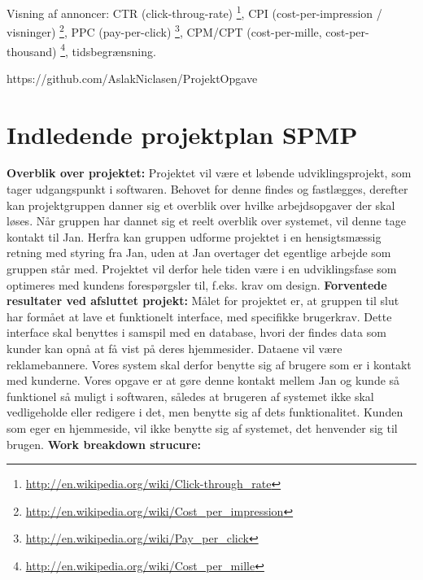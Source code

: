 \documentclass[a4paper,12pt]{article}
\begin{document}
Visning af annoncer: 
CTR (click-throug-rate) \footnote{\url{http://en.wikipedia.org/wiki/Click-through\_rate}}, CPI (cost-per-impression / visninger) \footnote{\url{http://en.wikipedia.org/wiki/Cost\_per\_impression}}, PPC (pay-per-click) \footnote{\url{http://en.wikipedia.org/wiki/Pay\_per\_click}}, CPM/CPT (cost-per-mille, cost-per-thousand) \footnote{\url{http://en.wikipedia.org/wiki/Cost\_per\_mille}}, tidsbegrænsning.

https://github.com/AslakNiclasen/ProjektOpgave

\section{Indledende projektplan SPMP}

\textbf{Overblik over projektet:}
\newline
Projektet vil være et løbende udviklingsprojekt, som tager udgangspunkt i softwaren. Behovet for denne findes og fastlægges, derefter kan projektgruppen danner sig et overblik over hvilke arbejdsopgaver der skal løses. Når gruppen har dannet sig et reelt overblik over systemet, vil denne tage kontakt til Jan. Herfra kan gruppen udforme projektet i en hensigtsmæssig retning med styring fra Jan, uden at Jan overtager det egentlige arbejde som gruppen står med. Projektet vil derfor hele tiden være i en udviklingsfase som optimeres med kundens forespørgsler til, f.eks. krav om design.
\newline
\newline
\textbf{Forventede resultater ved afsluttet projekt:}
\newline
Målet for projektet er, at gruppen til slut har formået at lave et funktionelt interface, med specifikke brugerkrav. Dette interface skal benyttes i samspil med en database, hvori der findes data som kunder kan opnå at få vist på deres hjemmesider. Dataene vil være reklamebannere. Vores system skal derfor benytte sig af brugere som er i kontakt med kunderne. 
Vores opgave er at gøre denne kontakt mellem Jan og kunde så funktionel så muligt i softwaren, således at brugeren af systemet ikke skal vedligeholde eller redigere i det, men benytte sig af dets funktionalitet. Kunden som eger en hjemmeside, vil ikke benytte sig af systemet, det henvender sig til brugen.
\newline
\newline
\textbf{Work breakdown strucure:}
\newline
\end{document}
